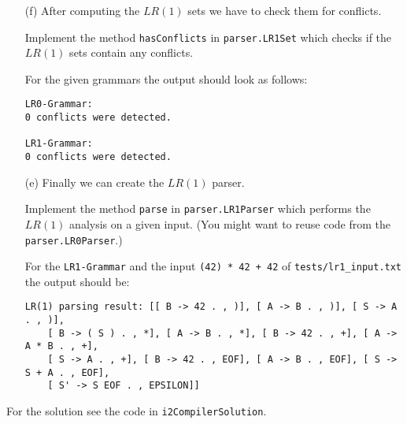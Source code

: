 \documentclass[a4paper]{article}
\begin{document}
\begin{exercise}{20}
\begin{itemize}
\begin{verbatim}
    [ A -> A . * B , +], [ A -> A . * B , *]
(, A, *: [ B -> . ( S ) , *], [ B -> . ( S ) , )], [ B -> . 42 , *], [ B -> . 42 , )], 
    [ A -> A * . B , +], [ A -> A * . B , *], [ A -> A * . B , )], [ B -> . 42 , +], 
    [ B -> . ( S ) , +]
(, S, ): [ B -> ( S ) . , EOF], [ B -> ( S ) . , +], [ B -> ( S ) . , *]
(, S, +, A: [ A -> A . * B , )], [ S -> S + A . , +], [ A -> A . * B , +], 
    [ A -> A . * B , *], [ S -> S + A . , )]
(, A, *, B: [ A -> A * B . , +], [ A -> A * B . , *], [ A -> A * B . , )]
(, S, +: [ B -> . ( S ) , *], [ B -> . ( S ) , )], [ B -> . 42 , *], [ B -> . 42 , )], 
    [ A -> . B , )], [ A -> . B , *], [ A -> . B , +], [ A -> . A * B , *], 
    [ A -> . A * B , )], [ S -> S + . A , +], [ A -> . A * B , +], [ S -> S + . A , )], 
    [ B -> . 42 , +], [ B -> . ( S ) , +]
(, (, S: [ S -> S . + A , )], [ S -> S . + A , +], [ B -> ( S . ) , +], 
    [ B -> ( S . ) , *], [ B -> ( S . ) , )]
(, (, S, ): [ B -> ( S ) . , +], [ B -> ( S ) . , *], [ B -> ( S ) . , )]
There are 23 LR(1) sets.
    \end{verbatim}

  \item[(f)] After computing the $LR(1)$ sets we have to check them for conflicts.

    Implement the method \texttt{hasConflicts} in \texttt{parser.LR1Set} which checks if the $LR(1)$ sets contain any conflicts.

    For the given grammars the output should look as follows:
    \begin{verbatim}
LR0-Grammar:
0 conflicts were detected.

LR1-Grammar:
0 conflicts were detected.
    \end{verbatim}

 \item[(e)] Finally we can create the $LR(1)$ parser.

    Implement the method \texttt{parse} in  \texttt{parser.LR1Parser} which performs the $LR(1)$ analysis on a given input. (You might want to reuse code from the \texttt{parser.LR0Parser}.)

    For the \texttt{LR1-Grammar} and the input \lstinline{(42) * 42 + 42} of \texttt{tests/lr1\_input.txt} the output should be:
    \begin{verbatim}
LR(1) parsing result: [[ B -> 42 . , )], [ A -> B . , )], [ S -> A . , )], 
    [ B -> ( S ) . , *], [ A -> B . , *], [ B -> 42 . , +], [ A -> A * B . , +], 
    [ S -> A . , +], [ B -> 42 . , EOF], [ A -> B . , EOF], [ S -> S + A . , EOF], 
    [ S' -> S EOF . , EPSILON]]
    \end{verbatim}
\end{itemize}

\end{exercise}


\begin{solution}
For the solution see the code in \texttt{i2CompilerSolution}.
\end{solution}
\end{document}
